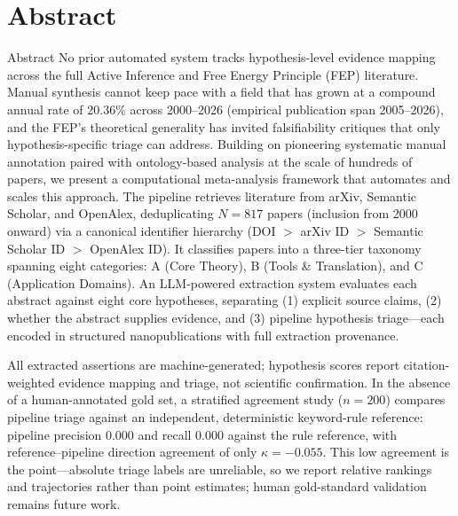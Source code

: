 \documentclass[
  ignorenonframetext,
]{beamer}
\author{\texorpdfstring{}{}}
\date{}
\begin{document}
\section{Abstract}\label{abstract}

\begin{frame}[allowframebreaks]{Abstract}
No prior automated system tracks hypothesis-level evidence mapping
across the full Active Inference and Free Energy Principle (FEP)
literature. Manual synthesis cannot keep pace with a field that has
grown at a compound annual rate of 20.36\% across 2000--2026 (empirical
publication span 2005--2026), and the FEP's theoretical generality has
invited falsifiability critiques that only hypothesis-specific triage
can address. Building on pioneering systematic manual annotation paired
with ontology-based analysis at the scale of hundreds of papers, we
present a computational meta-analysis framework that automates and
scales this approach. The pipeline retrieves literature from arXiv,
Semantic Scholar, and OpenAlex, deduplicating \(N = 817\) papers
(inclusion from 2000 onward) via a canonical identifier hierarchy (DOI
\(>\) arXiv ID \(>\) Semantic Scholar ID \(>\) OpenAlex ID). It
classifies papers into a three-tier taxonomy spanning eight categories:
A (Core Theory), B (Tools \& Translation), and C (Application Domains).
An LLM-powered extraction system evaluates each abstract against eight
core hypotheses, separating (1) explicit source claims, (2) whether the
abstract supplies evidence, and (3) pipeline hypothesis triage---each
encoded in structured nanopublications with full extraction provenance.

All extracted assertions are machine-generated; hypothesis scores report
citation-weighted evidence mapping and triage, not scientific
confirmation. In the absence of a human-annotated gold set, a stratified
agreement study (\(n = 200\)) compares pipeline triage against an
independent, deterministic keyword-rule reference: pipeline precision
0.000 and recall 0.000 against the rule reference, with
reference--pipeline direction agreement of only \(\kappa = -0.055\).
This low agreement is the point---absolute triage labels are unreliable,
so we report relative rankings and trajectories rather than point
estimates; human gold-standard validation remains future work.


\end{frame}
\end{document}
